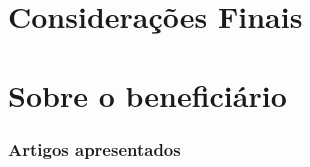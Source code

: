 \section{Considerações Finais}


\newpage
\section*{Sobre o beneficiário}


\subsubsection*{Artigos apresentados}
